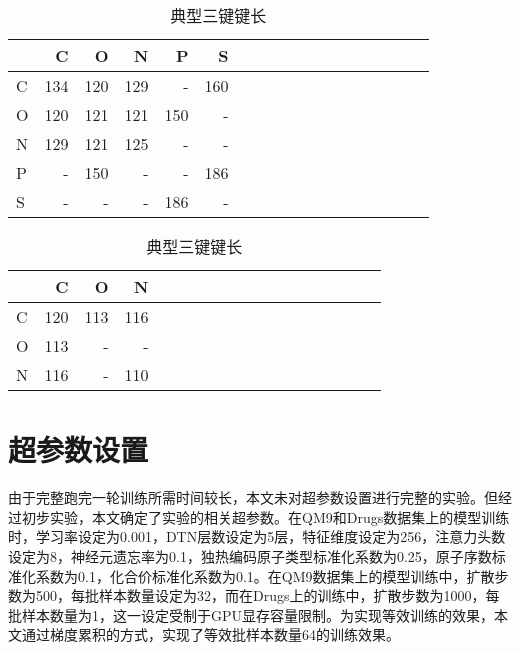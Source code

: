 {\begin{table}[H]
    \centering
    \begin{minipage}[t]{.5\textwidth}
    \begin{table}[H]
    \footnotesize
        \centering
        \caption{典型双键键长}
        \label{tab:double_bond_typ_dist}
        \begin{tabular}{l | r r r r r r r r r r r r r r r r r}
        \toprule
        & C & O & N & P & S \\ \midrule
        C & 134 & 120 & 129 & - & 160 \\
        O & 120 & 121 & 121 & 150 & - \\
        N & 129 & 121 & 125 & - & - \\
        P & - & 150 & - & - & 186 \\
        S & - & - & - & 186 & - \\
        \bottomrule
        \end{tabular}
    \end{table}
    \end{minipage}
    \begin{minipage}[t]{.4\textwidth}
    \begin{table}[H]
    \footnotesize
        \centering
        \caption{典型三键键长}
        \label{tab:tri_bond_typ_dist}
        \begin{tabular}{l | r r r r r r r r r r r r r r r r r}
        \toprule
        & C & O & N \\ \midrule
        C & 120 & 113 & 116 \\
        O & 113 & - & - \\
        N & 116 & - & 110 \\
        \bottomrule
        \end{tabular}
    \end{table}
    \end{minipage}
\end{table}

    
\section{超参数设置}
由于完整跑完一轮训练所需时间较长，本文未对超参数设置进行完整的实验。但经过初步实验，本文确定了实验的相关超参数。在QM9和Drugs数据集上的模型训练时，学习率设定为0.001，DTN层数设定为5层，特征维度设定为256，注意力头数设定为8，神经元遗忘率为0.1，独热编码原子类型标准化系数为0.25，原子序数标准化系数为0.1，化合价标准化系数为0.1。在QM9数据集上的模型训练中，扩散步数为500，每批样本数量设定为32，而在Drugs上的训练中，扩散步数为1000，每批样本数量为1，这一设定受制于GPU显存容量限制。为实现等效训练的效果，本文通过梯度累积的方式，实现了等效批样本数量64的训练效果。

}
